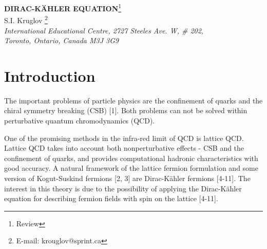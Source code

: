 \documentclass[a4paper,12pt]{article}
\begin{document}
\begin{center}
{\bf DIRAC-K\"AHLER EQUATION}\footnote{Review}\\
\vspace{5mm}
 S.I. Kruglov \footnote{E-mail: krouglov@sprint.ca}\\
\vspace{5mm}
\textit{International Educational Centre, 2727 Steeles Ave. W, \# 202, \\
Toronto, Ontario, Canada M3J 3G9}
\end{center}

\begin{abstract}
Tensor, matrix and quaternion formulations of Dirac-K\"ahler
equation for massive and massless fields are considered. The
equation matrices obtained are simple linear combinations of
matrix elements in the 16-dimensional space. The projection
matrix-dyads defining all the 16 independent equation solutions
are found. A method of computing the traces of 16-dimensional
Petiau-Duffin-Kemmer matrix product is considered. We show that
the symmetry group of the Dirac-K\"ahler tensor fields for charged
particles is \coordHE{} . The conservation currents corresponding
this symmetry are constructed. We analyze transformations of the
Lorentz group and quaternion fields.
Supersymmetry of the Dirac-K\"ahler fields with tensor and spinor
parameters is investigated. We show the possibility of constructing a
gauge model of interacting Dirac-K\"ahler fields where the gauge
group is the noncompact group under consideration.
\end{abstract}

\section{Introduction}

The important problems of particle physics are the confinement of quarks and
the chiral symmetry breaking (CSB) [1]. Both problems can not be solved
within perturbative quantum chromodynamics (QCD).

One of the promising methods in the infra-red limit of QCD is lattice QCD.
Lattice QCD takes into account both nonperturbative effects - CSB and the
confinement of quarks, and provides computational hadronic characteristics
with good accuracy. A natural framework of the lattice fermion formulation
and some version of Kogut-Suskind fermions [2, 3] are Dirac-K\"ahler
fermions [4-11]. The interest in this theory is due to the possibility of
applying the Dirac-K\"ahler equation for describing fermion fields with spin
\coordHE{} on the lattice [4-11].
\end{document}
